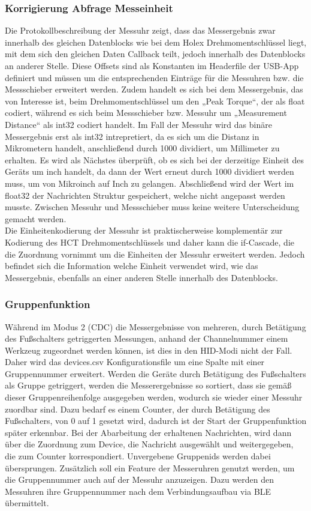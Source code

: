 \subsubsection{Korrigierung Abfrage Messeinheit}
Die Protokollbeschreibung der Messuhr zeigt, dass das Messergebnis zwar innerhalb des gleichen Datenblocks wie bei dem Holex Drehmomentschlüssel liegt, mit dem sich den gleichen Daten Callback teilt, jedoch innerhalb des Datenblocks an anderer Stelle. Diese Offsets sind als Konstanten im Headerfile der USB-App definiert und müssen um die entsprechenden Einträge für die Messuhren bzw. die Messschieber erweitert werden. Zudem handelt es sich bei dem Messergebnis, das von Interesse ist, beim Drehmomentschlüssel um den „Peak Torque“, der als float codiert, während es sich beim Messschieber bzw. Messuhr um „Measurement Distance“ als int32 codiert handelt. Im Fall der Messuhr wird das binäre Messergebnis erst als int32 intrepretiert, da es sich um die Distanz in Mikrometern handelt, anschließend durch 1000 dividiert, um Millimeter zu erhalten. Es wird als Nächstes überprüft, ob es sich bei der derzeitige Einheit des Geräts um inch handelt, da dann der Wert erneut durch 1000 dividiert werden muss, um von Mikroinch auf Inch zu gelangen. Abschließend wird der Wert im float32 der Nachrichten Struktur gespeichert, welche nicht angepasst werden musste. Zwischen Messuhr und Messschieber muss keine weitere Unterscheidung gemacht werden.\\
Die Einheitenkodierung der Messuhr ist praktischerweise komplementär zur Kodierung des HCT Drehmomentschlüssels und daher kann die if-Cascade, die die Zuordnung vornimmt um die Einheiten der Messuhr erweitert werden. Jedoch befindet sich die Information welche Einheit verwendet wird, wie das Messergebnis, ebenfalls an einer anderen Stelle innerhalb des Datenblocks.

\subsubsection{Gruppenfunktion}
Während im Modus 2 (CDC) die Messergebnisse von mehreren, durch Betätigung des Fußschalters getriggerten Messungen, anhand der Channelnummer einem Werkzeug zugeordnet werden können, ist dies in den HID-Modi nicht der Fall. Daher wird das devices.csv Konfigurationsfile um eine Spalte mit einer Gruppennummer erweitert. Werden die Geräte durch Betätigung des Fußschalters als Gruppe getriggert, werden die Messerergebnisse so sortiert, dass sie gemäß dieser Gruppenreihenfolge ausgegeben werden, wodurch sie wieder einer Messuhr zuordbar sind. Dazu bedarf es einem Counter, der durch Betätigung des Fußschalters, von 0 auf 1 gesetzt wird, dadurch ist der Start der Gruppenfunktion später erkennbar. Bei der Abarbeitung der erhaltenen Nachrichten, wird dann über die Zuordnung zum Device, die Nachricht ausgewählt und weitergegeben, die zum Counter korrespondiert. Unvergebene Gruppenids werden dabei übersprungen. Zusätzlich soll ein Feature der Messeruhren genutzt werden, um die Gruppennummer auch auf der Messuhr anzuzeigen. Dazu werden den Messuhren ihre Gruppennummer nach dem Verbindungsaufbau via BLE übermittelt.


